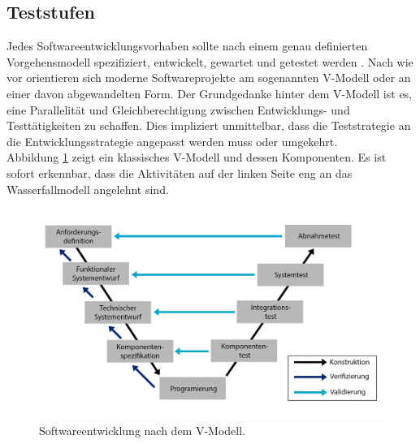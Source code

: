\subsection{Teststufen}
\label{sec:teststufen}
Jedes Softwareentwicklungsvorhaben sollte nach einem genau definierten Vorgehensmodell spezifiziert, entwickelt, gewartet und getestet werden \cite{spillner_basiswissen_2012}. Nach wie vor orientieren sich moderne Softwareprojekte am sogenannten V-Modell \cite{boehm_verifying_1984} oder an einer davon abgewandelten Form. Der Grundgedanke hinter dem V-Modell ist es, eine Parallelität und Gleichberechtigung zwischen Entwicklungs- und Testtätigkeiten zu schaffen. Dies impliziert unmittelbar, dass die Teststrategie an die Entwicklungsstrategie angepasst werden muss oder umgekehrt.\\

Abbildung \ref{fig:v_modell} zeigt ein klassisches V-Modell und dessen Komponenten. Es ist sofort erkennbar, dass die Aktivitäten auf der linken Seite eng an das Wasserfallmodell \cite{grechenig_softwaretechnik:_2010} angelehnt sind.

\begin{figure}[h] 
  \centering
     \includegraphics[width=1\textwidth]{figures/v_modell.png}
  \caption{Softwareentwicklung nach dem V-Modell.}
  \label{fig:v_modell}
\end{figure}



